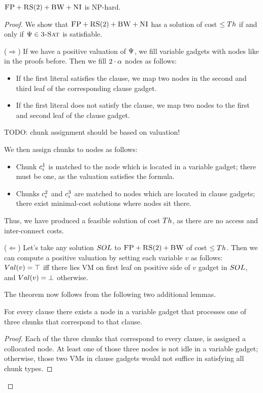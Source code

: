 \begin{theorem}
$\textsc{FP}+\textsc{RS}(2)+\textsc{BW}+\textsc{NI}$ is NP-hard.
\end{theorem}
\begin{proof}
We show that $\textsc{FP}+\textsc{RS}(2)+\textsc{BW}+\textsc{NI}$ has a solution of cost $\leq
  Th$ if and only if $\Psi\in \textsc{3-Sat}$ is satisfiable.

($\Rightarrow$) If we have a positive valuation of $\Psi$, we fill variable gadgets with nodes like in
the proofs before. Then we fill $2 \cdot \alpha$ nodes as follows:
\begin{itemize}
\item If the first literal satisfies the clause, we map two nodes in the second and
third leaf of the corresponding clause gadget.
\item If the first literal does not satisfy the clause, we map two nodes to the first
and second leaf of the clause gadget.
\end{itemize}

TODO: chunk assignment should be based on valuation!

We then assign chunks to nodes as follows:
\begin{itemize}
\item Chunk $c_i^1$ is matched to the node which is located in a variable gadget; there
must be one, as the valuation satisfies the formula.
\item Chunks $c_i^2$ and $c_i^3$ are matched to nodes which are
located in clause
gadgets; there exist minimal-cost solutions where nodes sit there.
\end{itemize}

Thus, we have produced a feasible solution of cost $Th$, as there are no
access and inter-connect costs.

($\Leftarrow$)
Let's take any solution $SOL$ to $\textsc{FP}+\textsc{RS}(2)+\textsc{BW}$ of cost $\leq Th$.
Then we can compute a positive valuation by setting each variable $v$
as follows:
$Val(v)= \top$ iff there lies VM on first leaf on positive side of $v$ gadget in $SOL$,
and $Val(v)=\bot$ otherwise. 


The theorem now follows from the following two additional lemmas.
\begin{lemma}
For every clause there exists a node in a variable gadget that processes one of
  three chunks that correspond to that clause.
\end{lemma}
\begin{proof}
 Each of the three chunks that correspond to every clause,
 is assigned a collocated node.
 At least one of those three nodes is not idle in a variable gadget;
otherwise, those two VMs in clause gadgets would not suffice in
satisfying all chunk types.
\end{proof}


\end{proof}
